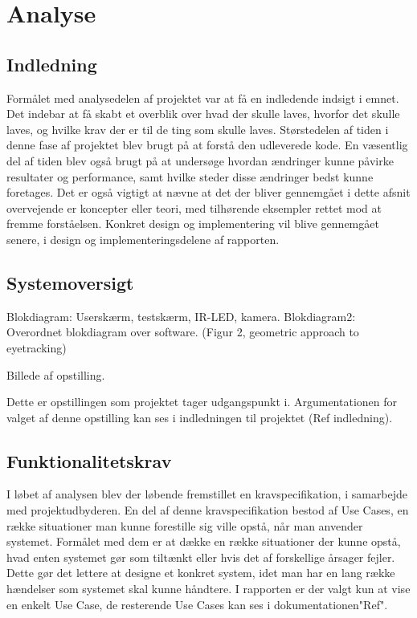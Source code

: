 \documentclass[rapport.tex]{subfiles}
\begin{document}
\section{Analyse}
	\subsection{Indledning}
	Formålet med analysedelen af projektet var at få en indledende indsigt i emnet. Det indebar at få skabt et overblik over hvad der skulle laves, hvorfor det skulle laves, og hvilke krav der er til de ting som skulle laves. Størstedelen af tiden i denne fase af projektet blev brugt på at forstå den udleverede kode. En væsentlig del af tiden blev også brugt på at undersøge hvordan ændringer kunne påvirke resultater og performance, samt hvilke steder disse ændringer bedst kunne foretages. Det er også vigtigt at nævne at det der bliver gennemgået i dette afsnit overvejende er koncepter eller teori, med tilhørende eksempler rettet mod at fremme forståelsen. Konkret design og implementering vil blive gennemgået senere, i design og implementeringsdelene af rapporten.
	
	\subsection{Systemoversigt}
	
	Blokdiagram: Userskærm, testskærm, IR-LED, kamera.
	Blokdiagram2: Overordnet blokdiagram over software. (Figur 2, geometric approach to eyetracking)
	
	Billede af opstilling.
	
	
	
	
	Dette er opstillingen som projektet tager udgangspunkt i. Argumentationen for valget af denne opstilling kan ses i indledningen til projektet (Ref indledning).
	
	\subsection{Funktionalitetskrav}
	
		I løbet af analysen blev der løbende fremstillet en kravspecifikation, i samarbejde med projektudbyderen. En del af denne kravspecifikation bestod af Use Cases, en række situationer man kunne forestille sig ville opstå, når man anvender systemet. Formålet med dem er at dække en række situationer der kunne opstå, hvad enten systemet gør som tiltænkt eller hvis det af forskellige årsager fejler. Dette gør det lettere at designe et konkret system, idet man har en lang række hændelser som systemet skal kunne håndtere. I rapporten er der valgt kun at vise en enkelt Use Case, de resterende Use Cases kan ses i dokumentationen"Ref". 
	
\end{document}
